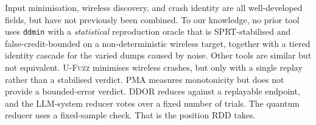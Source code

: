 Input minimisation, wireless discovery, and crash identity are all well-developed
fields, but have not previously been combined. To our knowledge, no prior tool uses
\texttt{ddmin} with a \emph{statistical} reproduction oracle that is SPRT-stabilised
and false-credit-bounded on a non-deterministic wireless target, together with a
tiered identity cascade for the varied dumps caused by noise. Other tools are
similar but not equivalent. \textsc{U-Fuzz} minimises wireless crashes, but only
with a single replay rather than a stabilised verdict. \textsc{PMA} measures
monotonicity but does not provide a bounded-error verdict. \textsc{DDOR} reduces against a replayable
endpoint, and the LLM-system reducer votes over a fixed number of trials. The quantum reducer uses a
fixed-sample check. That is the position RDD takes.
